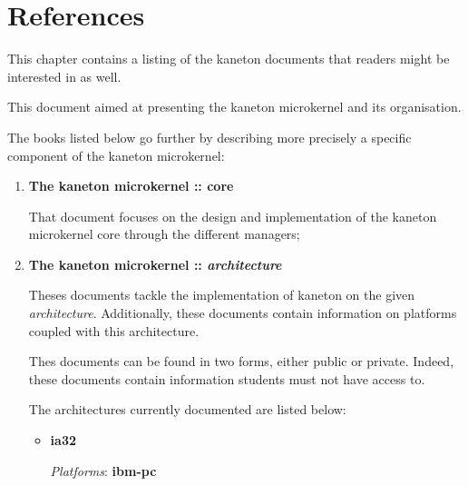 %
%
%
%
%
%

%
%

\chapter{References}
\label{chapter:references}

This chapter contains a listing of the kaneton documents that readers might
be interested in as well.

\newpage

%
%

This document aimed at presenting the kaneton microkernel and its organisation.

The books listed below go further by describing more precisely a specific
component of the kaneton microkernel:

\begin{enumerate}
  \item
    \textbf{The kaneton microkernel :: core}

    \-

    That document focuses on the design and implementation of the kaneton
    microkernel core through the different managers;
  \item
    \textbf{The kaneton microkernel :: \textit{architecture}}

    \-

    Theses documents tackle the implementation of kaneton on the given
    \textit{architecture}. Additionally, these documents contain information
    on platforms coupled with this architecture.

    \-

    Thes documents can be found in two forms, either public or private. Indeed,
    these documents contain information students must not have access to.

    \-

    The architectures currently documented are listed below:

    \begin{itemize}
      \item
	\textbf{ia32}

	\-

	\textit{Platforms}: \textbf{ibm-pc}
    \end{itemize}
\end{enumerate}
